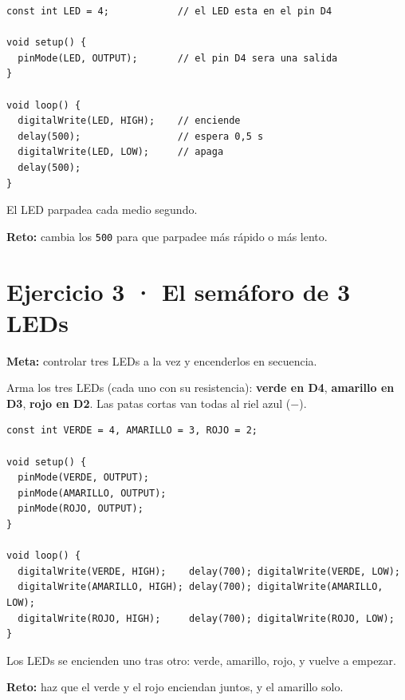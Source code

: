 \documentclass[10pt,letterpaper]{article}
\begin{document}
\begin{lstlisting}[style=arduino]
const int LED = 4;            // el LED esta en el pin D4

void setup() {
  pinMode(LED, OUTPUT);       // el pin D4 sera una salida
}

void loop() {
  digitalWrite(LED, HIGH);    // enciende
  delay(500);                 // espera 0,5 s
  digitalWrite(LED, LOW);     // apaga
  delay(500);
}
\end{lstlisting}

\begin{veras}El LED parpadea cada medio segundo.\end{veras}
\begin{reto}\textbf{Reto:} cambia los \texttt{500} para que parpadee más rápido o más lento.\end{reto}

\section{Ejercicio 3 · El semáforo de 3 LEDs}
\begin{objetivo}\textbf{Meta:} controlar tres LEDs a la vez y encenderlos en secuencia.\end{objetivo}

Arma los tres LEDs (cada uno con su resistencia): \textbf{verde en D4}, \textbf{amarillo en D3},
\textbf{rojo en D2}. Las patas cortas van todas al riel azul ($-$).

\begin{lstlisting}[style=arduino]
const int VERDE = 4, AMARILLO = 3, ROJO = 2;

void setup() {
  pinMode(VERDE, OUTPUT);
  pinMode(AMARILLO, OUTPUT);
  pinMode(ROJO, OUTPUT);
}

void loop() {
  digitalWrite(VERDE, HIGH);    delay(700); digitalWrite(VERDE, LOW);
  digitalWrite(AMARILLO, HIGH); delay(700); digitalWrite(AMARILLO, LOW);
  digitalWrite(ROJO, HIGH);     delay(700); digitalWrite(ROJO, LOW);
}
\end{lstlisting}

\begin{veras}Los LEDs se encienden uno tras otro: verde, amarillo, rojo, y vuelve a empezar.\end{veras}
\begin{reto}\textbf{Reto:} haz que el verde y el rojo enciendan juntos, y el amarillo solo.\end{reto}
\end{document}
